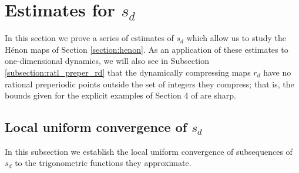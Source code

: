 \documentclass[12pt]{amsart}
\theoremstyle{definition}
\begin{document}
\section{Estimates for $s_d$}

In this section we prove a series of estimates of $s_d$ which allow us to study the H\'enon maps of Section \ref{section:henon}.  As an application of these estimates to one-dimensional dynamics, we will also see in Subsection \ref{subsection:ratl_preper_rd} that the dynamically compressing maps $r_d$ have no rational preperiodic points outside the set of integers they compress; that is, the bounds given for the explicit examples of Section 4 of \cite{doyle2022polynomialsrationalpreperiodicpoints} are sharp.



\subsection{Local uniform convergence of $s_d$}

In this subsection we establish the local uniform convergence of subsequences of $s_d$ to the trigonometric functions they approximate.  
\end{document}
